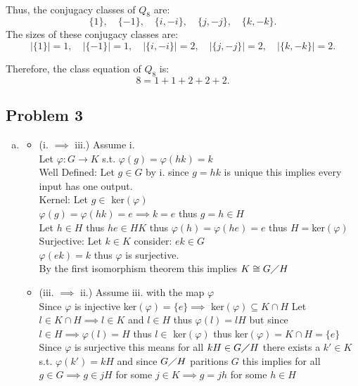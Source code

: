 \documentclass[12pt, letterpaper]{article}
\theoremstyle{definition}
\begin{document}
\phantom{text}\\
Thus, the conjugacy classes of \( Q_8 \) are:
\[
\{ 1 \}, \quad \{ -1 \}, \quad \{ i, -i \}, \quad \{ j, -j \}, \quad \{ k, -k \}.
\]
The sizes of these conjugacy classes are:
\[
| \{ 1 \} | = 1, \quad | \{ -1 \} | = 1, \quad | \{ i, -i \} | = 2, \quad | \{ j, -j \} | = 2, \quad | \{ k, -k \} | = 2.
\]

Therefore, the class equation of \( Q_8 \) is:
\[
8 = 1 + 1 + 2 + 2 + 2.
\]

\newpage
\subsection*{Problem 3}
\begin{enumerate}[(a)]
    \item \begin{itemize}
        \item (i. $\implies$ iii.) Assume i.\\
        Let $\varphi:G \rightarrow K$ s.t. $\varphi(g)=\varphi(hk)=k$\\
        Well Defined:
        Let $g \in G$ by i. since $g=hk$ is unique this implies every input has one output.\\
        Kernel:
        Let $g \in$ ker$(\varphi)$\\
        $\varphi(g)=\varphi(hk)=e \implies k=e$ thus $g=h \in H$\\
        Let $h \in H$ thus $he \in HK$ thus $\varphi(h)=\varphi(he)=e$ thus $H=$ker$(\varphi)$\\
        Surjective: Let $k \in K$ consider: $ek \in G$\\
        $\varphi(ek)=k$ thus $\varphi$ is surjective.\\
        By the first isomorphism theorem this implies $K \cong G\diagup H$
        \item (iii. $\implies$ ii.) Assume iii. with the map $\varphi$\\
        Since $\varphi$ is injective ker$(\varphi)=\{e\} \implies$ ker$(\varphi) \subseteq K \cap H$
        Let $l \in K \cap H \implies l \in K$ and $l \in H$ thus $\varphi(l)=lH$ but since $l \in H \implies \varphi(l)=H$ thus $l \in$ ker$(\varphi)$ thus ker$(\varphi)=K \cap H=\{e\}$\\
        Since $\varphi$ is surjective this means for all $kH \in G \diagup H$ there exists a $k' \in K$ s.t. $\varphi(k')=kH$ and since $G \diagup H$ paritions $G$ this implies for all $g \in G \implies g \in jH$ for some $j \in K \implies g=jh$ for some $h \in H$\\

\end{itemize}
\end{enumerate}
\end{document}
